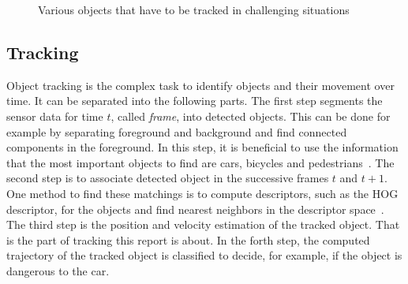 \documentclass[twoside,a4paper,article]{combine}
\begin{document}
\begin{figure}
  
  \caption{Various objects that have to be tracked in challenging
    situations~\cite{held-website}}
  \label{fig:objects}
\end{figure}


\subsection{Tracking}
\label{sub:tracking}
Object tracking is the complex task to identify objects and their
movement over time. It can be separated into the following parts. The
first step segments the sensor data for time $t$, called
\textit{frame}, into detected objects. This can be done for example by
separating foreground and background and find connected components in
the foreground. In this step, it is beneficial to use the information that
the most important objects to find are cars, bicycles and
pedestrians~\cite{segmentation}. The second step is to associate
detected object in the successive frames $t$ and $t+1$. One method to
find these matchings is to compute descriptors, such as the HOG
descriptor, for the objects and find nearest neighbors in the
descriptor space~\cite{arbitrary-object-recognition}. The third step
is the position and velocity estimation of the tracked object. That is
the part of tracking this report is about. In the forth step, the
computed trajectory of the tracked object is classified to decide, for
example, if the object is dangerous to the car.
\end{document}
